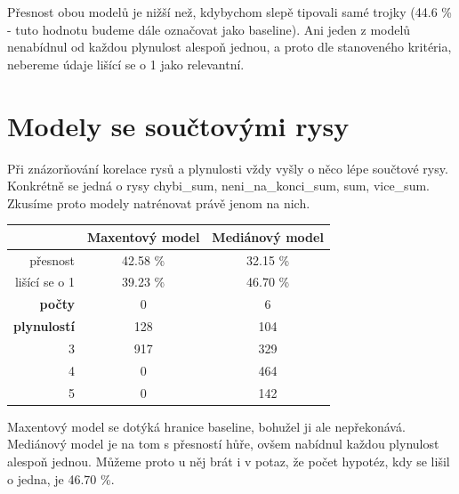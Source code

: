 \documentclass[12pt,a4paper]{report}
\begin{document}
Přesnost obou modelů je nižší než, kdybychom slepě tipovali samé trojky (44.6 \% - tuto hodnotu budeme dále označovat jako baseline). Ani jeden z modelů nenabídnul od každou plynulost alespoň jednou, a proto dle stanoveného kritéria, nebereme údaje lišící se o 1 jako relevantní.


\section{Modely se součtovými rysy}
Při znázorňování korelace rysů a plynulosti vždy vyšly o něco lépe součtové rysy. Konkrétně se jedná o rysy chybi\_sum, neni\_na\_konci\_sum, sum, vice\_sum. Zkusíme proto modely natrénovat právě jenom na nich. 

\begin{center}
\begin{tabular}{|r|c|c|}
\hline
 & \textbf{Maxentový model} & \textbf{Mediánový model} \\
 \hline
     přesnost & 42.58 \%  & 32.15 \%  \\
\hline
lišící se o 1 & 39.23 \% & 46.70 \%  \\
\hline
     \textbf{počty} \quad 1 & \color{red}0   & \color{OliveGreen}6   \\
\textbf{plynulostí} \quad 2 & 128 & \color{OliveGreen}104   \\
                          3 & 917 & \color{OliveGreen}329 \\
                          4 & \color{red}0   & \color{OliveGreen}464 \\
                          5 & \color{red}0   & \color{OliveGreen}142  \\
\hline
\end{tabular}
\end{center}
Maxentový model se dotýká hranice baseline, bohužel ji ale nepřekonává. Mediánový model je na tom s přesností hůře, ovšem nabídnul každou plynulost alespoň jednou. Můžeme proto u něj brát i v potaz, že počet hypotéz, kdy se lišil o jedna, je 46.70 \%.
\end{document}
